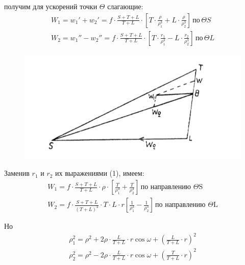 \documentclass[a4paper,12pt]{article}
\begin{document}
получим для ускорений точки $\Theta$ слагающие:
\begin{equation*}
	\begin{aligned}
		W_1 = w_1 ' + w_2 ' = f \cdot \frac{S+T+L}{T+L} \cdot \left[ T \cdot \frac{\rho}{\rho_1 ^3} + L \cdot \frac{\rho}{\rho_2 ^3} \right] \, по \, \Theta S \\
		W_2 = w_1 '' - w_2 '' = f \cdot \frac{S+T+L}{T+L} \cdot \left[ T \cdot \frac{r_1}{\rho_1 ^3} - L \cdot \frac{r_2}{\rho_2 ^3} \right] \, по \, \Theta L
	\end{aligned}
\end{equation*}

\begin{figure}[!h]
  \begin{center}
    \includegraphics[width=0.7\linewidth, keepaspectratio]{23.png}
    \caption{}\label{fig:23}
  \end{center}
\end{figure}

Заменив $r_1$ и $r_2$ их выражениями (1), имеем:
\begin{equation*}
	\begin{aligned}
		W_1 = f \cdot \frac{S+T+L}{T+L} \cdot \rho \cdot \left[ \frac{T}{\rho_1 ^3} + \frac{T}{\rho_2 ^3} \right] \, \text{по направлению $\Theta$S} \\
		W_2 = f \cdot \frac{S+T+L}{(T+L)^2} \cdot T \cdot L \cdot r \left[\frac{1}{\rho_1 ^3} - \frac{1}{\rho_2 ^3} \right] \, \text{по направлению $\Theta$L}
	\end{aligned}
\end{equation*}

Но
\begin{equation*}
	\begin{aligned}
      \rho_1 ^2 = \rho^2 + 2\rho \cdot \frac{L}{T+L} \cdot r \cos \omega + \left( \frac{L}{T+L} \cdot r \right) ^2 \\
      \rho_2 ^2 = \rho^2 - 2\rho \cdot \frac{L}{T+L} \cdot r \cos \omega + \left( \frac{T}{T+L} \cdot r \right) ^2
	\end{aligned}
\end{equation*}
\end{document}

